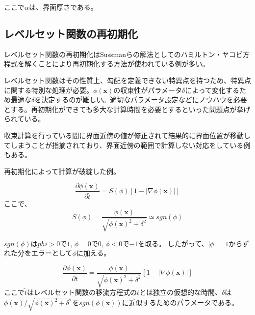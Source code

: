 ここで$\alpha$は、界面厚さである。



\subsection{レベルセット関数の再初期化}

レベルセット関数の再初期化はSussmanらの解法\cite{Sussman1994}としてのハミルトン・ヤコビ方程式を解くことにより再初期化する方法が使われている例が多い\cite{Himeno1999}。

レベルセット関数はその性質上、勾配を定義できない特異点を持つため、特異点に関する特別な処理が必要。$\phi(\bm{x})$の収束性がパラメータ$\delta$によって変化するため最適な$\delta$を決定するのが難しい。適切なパラメータ設定などにノウハウを必要とする。再初期化ができても多大な計算時間を必要とするといった問題点が挙げられている\cite{Yamazaki2007}。

収束計算を行っている間に界面近傍の値が修正されて結果的に界面位置が移動してしまうことが指摘されており、界面近傍の範囲で計算しない対応をしている例もある\cite{Tsubogo2003}。

再初期化によって計算が破綻した例\cite{Shono2017}。

\begin{equation}
\label{levelset-reinitialization}
	\frac{\partial \phi (\bm{x})}{\partial \tilde{t}} = S(\phi)[1-|\nabla \phi (\bm{x})|]
\end{equation}
ここで、
\begin{equation}
\label{levelset-reinitialization}
	S(\phi) = \frac{\phi (\bm{x})}{\sqrt{\phi(\bm{x})^2 + \delta^2}} \simeq sgn(\phi)
\end{equation}

$sgn(\phi)$は$phi>0$で$1$, $\phi=0$で$0$, $\phi<0$で$-1$を取る。
したがって、$|\phi|=1$からずれた分をエラーとして$\phi$に加える。

\begin{equation}
\label{levelset-reinitialization}
	\frac{\partial \phi (\bm{x})}{\partial \tilde{t}} = \frac{\phi (\bm{x})}{\sqrt{\phi(\bm{x})^2 + \delta^2}}[1-|\nabla \phi (\bm{x})|]
\end{equation}
ここで$\tilde{t}$はレベルセット関数の移流方程式の$t$とは独立の仮想的な時間、$\delta$は$\phi(\bm{x})/\sqrt{\phi(\bm{x})^2+\delta^2}$を$sgn(\phi(\bm{x}))$に近似するためのパラメータである。

